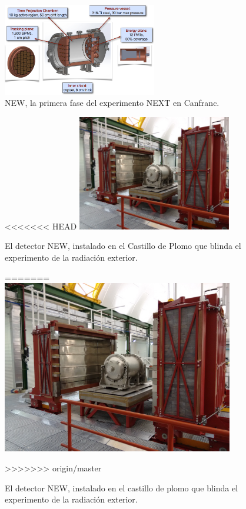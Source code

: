 \begin{figure}
\centering
\includegraphics[width=0.6\textwidth]{img/NEW.png}
\caption{\small NEW, la primera fase del experimento NEXT en Canfranc.} \label{fig:NEW}
\end{figure} 

\begin{figure}
\centering
<<<<<<< HEAD
\includegraphics[width=0.6\textwidth]{img/NewCastle.png}
\caption{\small El detector NEW, instalado en el Castillo de Plomo que blinda el experimento de la radiación exterior.} \label{fig.NewCastle}
=======
\includegraphics[width=0.9\textwidth]{img/NewCastle.png}
\caption{\small El detector NEW, instalado en el castillo de plomo que blinda el experimento de la radiación exterior.} \label{fig.NewCastle}
>>>>>>> origin/master
\end{figure} 

